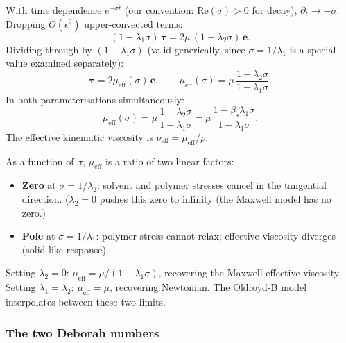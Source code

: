 \begin{derivbox}
With time dependence $e^{-\sigma t}$ (our convention: $\mathrm{Re}(\sigma)>0$
for decay), $\partial_t \to -\sigma$. Dropping $O(\epsilon^2)$ upper-convected
terms:
\[
  (1 - \lambda_1\sigma)\,\boldsymbol{\tau}
  = 2\mu\,(1 - \lambda_2\sigma)\,\mathbf{e}.
\]
Dividing through by $(1 - \lambda_1\sigma)$ (valid generically, since
$\sigma = 1/\lambda_1$ is a special value examined separately):
\begin{equation}
  \boldsymbol{\tau} = 2\mu_{\mathrm{eff}}(\sigma)\,\mathbf{e},
  \qquad
  \mu_{\mathrm{eff}}(\sigma) = \mu\,\frac{1-\lambda_2\sigma}{1-\lambda_1\sigma}.
  \label{eq:mueff_OB}
\end{equation}
In both parameterisations simultaneously:
\begin{equation}
  \mu_{\mathrm{eff}}(\sigma)
  = \mu\,\frac{1-\lambda_2\sigma}{1-\lambda_1\sigma}
  = \mu\,\frac{1-\beta_s\lambda_1\sigma}{1-\lambda_1\sigma}.
  \label{eq:mueff_both}
\end{equation}
The effective kinematic viscosity is $\nu_{\mathrm{eff}} =
\mu_{\mathrm{eff}}/\rho$.
\end{derivbox}

\begin{notebox}
As a function of $\sigma$, $\mu_{\mathrm{eff}}$ is a ratio of two linear
factors:
\begin{itemize}
  \item \textbf{Zero} at $\sigma = 1/\lambda_2$: solvent and polymer stresses
        cancel in the tangential direction. ($\lambda_2 = 0$ pushes this
        zero to infinity (the Maxwell model has no zero.)
  \item \textbf{Pole} at $\sigma = 1/\lambda_1$: polymer stress cannot relax;
        effective viscosity diverges (solid-like response).
\end{itemize}
Setting $\lambda_2 = 0$: $\mu_{\mathrm{eff}} = \mu/(1-\lambda_1\sigma)$,
recovering the Maxwell effective viscosity. Setting $\lambda_1 = \lambda_2$:
$\mu_{\mathrm{eff}} = \mu$, recovering Newtonian. The Oldroyd-B model
interpolates between these two limits.
\end{notebox}

\subsubsection{The two Deborah numbers}

